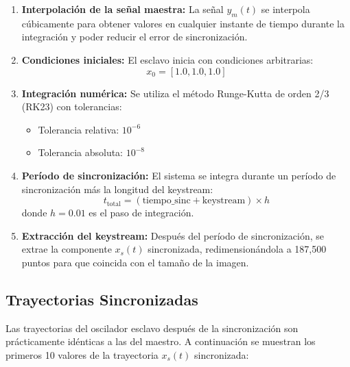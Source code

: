 \documentclass[12pt,a4paper]{article}
\begin{document}
	\begin{enumerate}
		\item \textbf{Interpolación de la señal maestra:} La señal $y_m(t)$ se interpola cúbicamente para obtener valores en cualquier instante de tiempo durante la integración y poder reducir el error de sincronización.
		
		\item \textbf{Condiciones iniciales:} El esclavo inicia con condiciones arbitrarias:
		$$x_0 = [1.0, 1.0, 1.0]$$
		
		\item \textbf{Integración numérica:} Se utiliza el método Runge-Kutta de orden 2/3 (RK23) con tolerancias:
		\begin{itemize}
			\item Tolerancia relativa: $10^{-6}$
			\item Tolerancia absoluta: $10^{-8}$
		\end{itemize}
		
		\item \textbf{Período de sincronización:} El sistema se integra durante un período de sincronización más la longitud del keystream:
		$$t_{\text{total}} = (\text{tiempo\_sinc} + \text{keystream}) \times h$$
		donde $h = 0.01$ es el paso de integración.
		
		\item \textbf{Extracción del keystream:} Después del período de sincronización, se extrae la componente $x_s(t)$ sincronizada, redimensionándola a 187,500 puntos para que coincida con el tamaño de la imagen.
	\end{enumerate}
	
	\subsection{Trayectorias Sincronizadas}
	
	Las trayectorias del oscilador esclavo después de la sincronización son prácticamente idénticas a las del maestro. A continuación se muestran los primeros 10 valores de la trayectoria $x_s(t)$ sincronizada:
	
\end{document}
